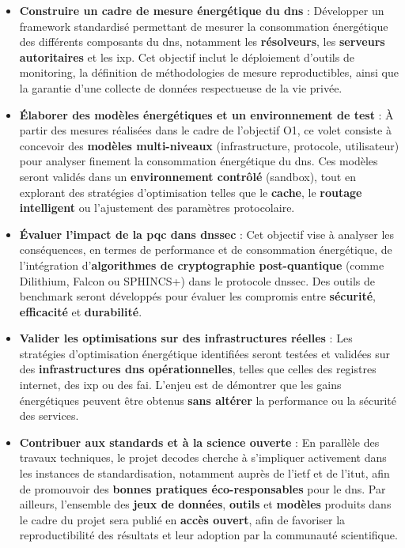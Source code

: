 \documentclass[12pt, a4paper]{report}
\begin{document}
	\begin{itemize}
		\item[\textbf{O1 )}] \textbf{Construire un cadre de mesure énergétique du \gls{dns}} :
		Développer un framework standardisé permettant de mesurer la consommation énergétique des différents composants du \gls{dns}, notamment les \textbf{résolveurs}, les \textbf{serveurs autoritaires} et les \gls{ixp}. Cet objectif inclut le déploiement d'outils de monitoring, la définition de méthodologies de mesure reproductibles, ainsi que la garantie d'une collecte de données respectueuse de la vie privée.

		\item[\textbf{O2 )}] \textbf{Élaborer des modèles énergétiques et un environnement de test} :
		À partir des mesures réalisées dans le cadre de l'objectif O1, ce volet consiste à concevoir des \textbf{modèles multi-niveaux} (infrastructure, protocole, utilisateur) pour analyser finement la consommation énergétique du \gls{dns}. Ces modèles seront validés dans un \textbf{environnement contrôlé} (sandbox), tout en explorant des stratégies d'optimisation telles que le \textbf{cache}, le \textbf{routage intelligent} ou l'ajustement des paramètres protocolaire.

		\item[\textbf{O3 )}] \textbf{Évaluer l'impact de la \gls{pqc} dans \gls{dnssec}} :
		Cet objectif vise à analyser les conséquences, en termes de performance et de consommation énergétique, de l'intégration d'\textbf{algorithmes de cryptographie post-quantique} (comme Dilithium, Falcon ou SPHINCS+) dans le protocole \gls{dnssec}. Des outils de benchmark seront développés pour évaluer les compromis entre \textbf{sécurité}, \textbf{efficacité} et \textbf{durabilité}.

		\item[\textbf{O4 )}] \textbf{Valider les optimisations sur des infrastructures réelles} :
		Les stratégies d'optimisation énergétique identifiées seront testées et validées sur des \textbf{infrastructures \gls{dns} opérationnelles}, telles que celles des registres internet, des \gls{ixp} ou des \gls{fai}. L'enjeu est de démontrer que les gains énergétiques peuvent être obtenus \textbf{sans altérer} la performance ou la sécurité des services.

		\item[\textbf{O5 )}] \textbf{Contribuer aux standards et à la science ouverte} :
		En parallèle des travaux techniques, le projet \gls{decodes} cherche à s'impliquer activement dans les instances de standardisation, notamment auprès de l'\gls{ietf} et de l'\gls{itut}, afin de promouvoir des \textbf{bonnes pratiques éco-responsables} pour le \gls{dns}. Par ailleurs, l'ensemble des \textbf{jeux de données}, \textbf{outils} et \textbf{modèles} produits dans le cadre du projet sera publié en \textbf{accès ouvert}, afin de favoriser la reproductibilité des résultats et leur adoption par la communauté scientifique.
	\end{itemize}
\end{document}
